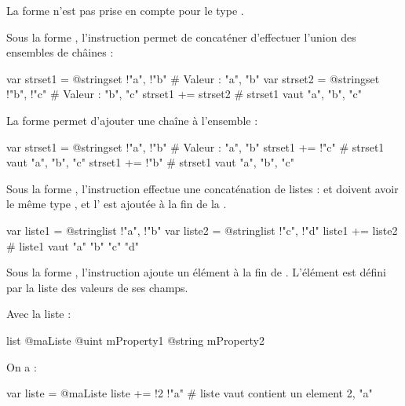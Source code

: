 La forme  n'est pas prise en compte pour le type .




Sous la forme , l'instruction permet de concaténer d'effectuer l'union des ensembles de châines :
\begin{galgascode}
var strset1 = @stringset {!"a", !"b"} # Valeur : "a", "b"
var strset2 = @stringset {!"b", !"c"} # Valeur : "b", "c"
strset1 += strset2 # strset1 vaut "a", "b", "c"
\end{galgascode}

La forme  permet d'ajouter une chaîne à l'ensemble :
\begin{galgascode}
var strset1 = @stringset {!"a", !"b"} # Valeur : "a", "b"
strset1 += !"c" # strset1 vaut "a", "b", "c"
strset1 += !"b" # strset1 vaut "a", "b", "c"
\end{galgascode}




Sous la forme , l'instruction effectue une concaténation de listes :  et  doivent avoir le même type , et l' est ajoutée à la fin de la .

\begin{galgascode}
var liste1 = @stringlist {!"a", !"b"}
var liste2 = @stringlist {!"c", !"d"}
liste1 += liste2 # liste1 vaut "a" "b" "c" "d"
\end{galgascode}



Sous la forme , l'instruction ajoute un élément à la fin de . L'élément est défini par la liste des valeurs de ses champs.

Avec la liste :
\begin{galgascode}
list @maListe {
  @uint mProperty1
  @string mProperty2
}
\end{galgascode}

On a :

\begin{galgascode}
var liste = @maListe {}
liste += !2 !"a" # liste vaut contient un element 2, "a"
\end{galgascode}






